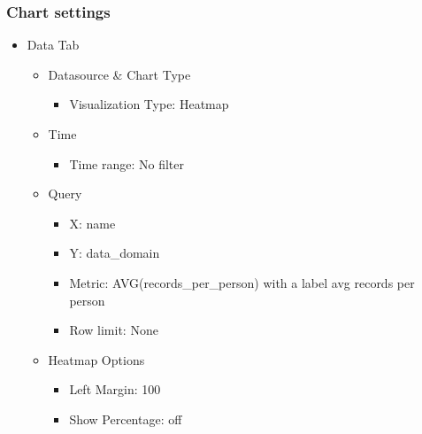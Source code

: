 \documentclass[
]{book}
\providecommand{\tightlist}{%
  \setlength{\itemsep}{0pt}\setlength{\parskip}{0pt}}
\begin{document}
\hypertarget{chart-settings-37}{%
\subsubsection*{Chart settings}\label{chart-settings-37}}

\begin{itemize}
\tightlist
\item
  Data Tab

  \begin{itemize}
  \tightlist
  \item
    Datasource \& Chart Type

    \begin{itemize}
    \tightlist
    \item
      Visualization Type: Heatmap
    \end{itemize}
  \item
    Time

    \begin{itemize}
    \tightlist
    \item
      Time range: No filter
    \end{itemize}
  \item
    Query

    \begin{itemize}
    \tightlist
    \item
      X: name
    \item
      Y: data\_domain
    \item
      Metric: AVG(records\_per\_person) with a label avg records per person
    \item
      Row limit: None
    \end{itemize}
  \item
    Heatmap Options

    \begin{itemize}
    \tightlist
    \item
      Left Margin: 100
    \item
      Show Percentage: off
    \end{itemize}
  \end{itemize}
\end{itemize}

  
\end{document}
